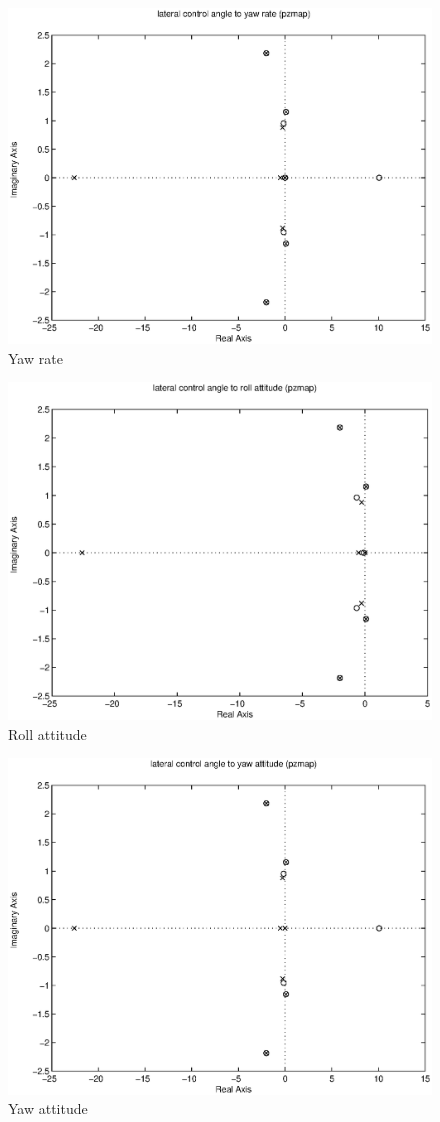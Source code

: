 \documentclass{sydeStyle}
\begin{document}
\begin{figure}[h]
    \centering
    \includegraphics[width=0.8\columnwidth]{figs/27pz}
    \caption{Yaw rate}
    \label{fig:lat3}
\end{figure}

\begin{figure}[h]
    \centering
    \includegraphics[width=0.8\columnwidth]{figs/28pz}
    \caption{Roll attitude}
    \label{fig:lat4}
\end{figure}

\begin{figure}[h]
    \centering
    \includegraphics[width=0.8\columnwidth]{figs/29pz}
    \caption{Yaw attitude}
    \label{fig:lat5}
\end{figure}
\end{document}
